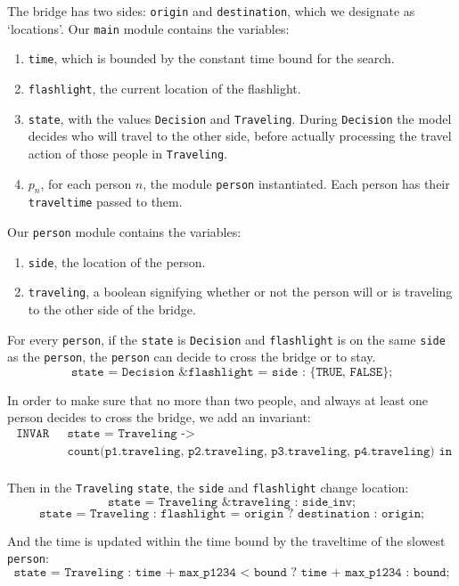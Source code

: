 \documentclass[12pt]{article}
\begin{document}
The bridge has two sides: \texttt{origin} and \texttt{destination}, which we designate as `locations'.
Our \texttt{main} module contains the variables:
\begin{enumerate}
\item \texttt{time}, which is bounded by the constant time bound for the search.
\item \texttt{flashlight}, the current location of the flashlight.
\item \texttt{state}, with the values \texttt{Decision} and \texttt{Traveling}. During \texttt{Decision} the model decides who will travel to the other side, before actually processing the travel action of those people in \texttt{Traveling}.
\item $p_n$, for each person $n$, the module \texttt{person} instantiated.
    Each person has their \texttt{traveltime} passed to them.
\end{enumerate}

Our \texttt{person} module contains the variables:
\begin{enumerate}
\item \texttt{side}, the location of the person.
\item \texttt{traveling}, a boolean signifying whether or not the person will or is traveling to the other side of the bridge.
\end{enumerate}

For every \texttt{person}, if the \texttt{state} is \texttt{Decision} and \texttt{flashlight} is on the same \texttt{side} as the \texttt{person}, the \texttt{person} can decide to cross the bridge or to stay.
\[ \texttt{state = Decision \& flashlight = side : \{TRUE, FALSE\};} \]

In order to make sure that no more than two people, and always at least one person decides to cross the bridge, we add an invariant:
\[
    \begin{array}{ll}
        \texttt{ INVAR } & \texttt{ state = Traveling -> } \\
        & \texttt{ count(p1.traveling, p2.traveling, p3.traveling, p4.traveling) in 1..2; } \\
    \end{array}
\]

Then in the \texttt{Traveling} \texttt{state}, the \texttt{side} and \texttt{flashlight} change location:
\[ \texttt{state = Traveling \& traveling : side\_inv;} \]
\[ \texttt{state = Traveling : flashlight = origin ? destination : origin;} \]

And the time is updated within the time bound by the traveltime of the slowest \texttt{person}:
\[ \texttt{state = Traveling : time + max\_p1234 < bound ? time + max\_p1234 : bound;} \]
\end{document}
